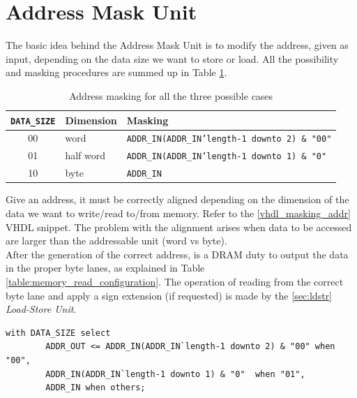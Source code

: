 \section{Address Mask Unit}
The basic idea behind the Address Mask Unit is to modify the address, given as input, depending on the data size we want to store or load. All the possibility and masking procedures are summed up in Table \ref{tab:addr_masking}. 

\begin{table}[ht]
    \begin{center}
        \begin{tabular}{ c| l | l}
            \texttt{DATA\_SIZE} & \textbf{Dimension} & \textbf{Masking}\\
            \hline
            00 & word & \texttt{ADDR\_IN(ADDR\_IN'length-1 downto 2) \& "00"}\\
            01 & half word & \texttt{ADDR\_IN(ADDR\_IN'length-1 downto 1) \& "0"} \\
            10 & byte & \texttt{ADDR\_IN}
            
        \end{tabular}
        \caption{Address masking for all the three possible cases}
        \label{tab:addr_masking}
    \end{center}
\end{table}


Give an address, it must be correctly aligned depending on the dimension of the data we want to write/read to/from memory. Refer to the \ref{vhdl_masking_addr} VHDL snippet. The problem with the alignment arises when data to be accessed are larger than the addressable unit (word vs byte). \\

After the generation of the correct address, is a DRAM duty to output the data in the proper byte lanes, as explained in Table \ref{table:memory_read_configuration}. The operation of reading from the correct byte lane and apply a sign extension (if requested) is made by the \ref{sec:ldstr} \emph{Load-Store Unit}.



\hfill
\begin{lstlisting}[style=vhdl,caption={VHDL code for address alignment},label=vhdl_masking_addr]
    with DATA_SIZE select
        ADDR_OUT <= ADDR_IN(ADDR_IN`length-1 downto 2) & "00" when "00",
        ADDR_IN(ADDR_IN`length-1 downto 1) & "0"  when "01",
        ADDR_IN when others;
\end{lstlisting}

